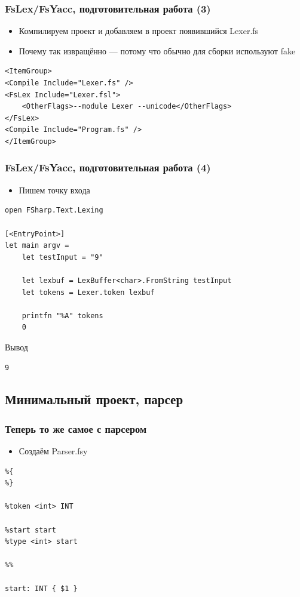 \documentclass[xetex,mathserif,serif]{beamer}
\begin{document}
    \begin{frame}[fragile]
        \frametitle{FsLex/FsYacc, подготовительная работа (3)}
        \begin{itemize}
            \item Компилируем проект и добавляем в проект появившийся Lexer.fs
            \item Почему так извращённо --- потому что обычно для сборки используют fake
        \end{itemize}
        \begin{scriptsize}
            \begin{verbatim}
<ItemGroup>
<Compile Include="Lexer.fs" />
<FsLex Include="Lexer.fsl">
    <OtherFlags>--module Lexer --unicode</OtherFlags>
</FsLex>
<Compile Include="Program.fs" />
</ItemGroup>
            \end{verbatim}
        \end{scriptsize}
    \end{frame}

    \begin{frame}[fragile]
        \frametitle{FsLex/FsYacc, подготовительная работа (4)}
        \begin{itemize}
            \item Пишем точку входа
        \end{itemize}
        \begin{verbatim}
open FSharp.Text.Lexing

[<EntryPoint>]
let main argv =
    let testInput = "9"

    let lexbuf = LexBuffer<char>.FromString testInput
    let tokens = Lexer.token lexbuf

    printfn "%A" tokens
    0 
        \end{verbatim}

        \begin{exampleblock}{Вывод}
            \begin{verbatim}
9
            \end{verbatim}
        \end{exampleblock}
    \end{frame}

    \subsection{Минимальный проект, парсер}

    \begin{frame}[fragile]
        \frametitle{Теперь то же самое с парсером}
        \begin{itemize}
            \item Создаём Parser.fsy
        \end{itemize}
        \begin{verbatim}
%{
%}

%token <int> INT

%start start
%type <int> start

%%

start: INT { $1 }
        \end{verbatim}
    \end{frame}
\end{document}
